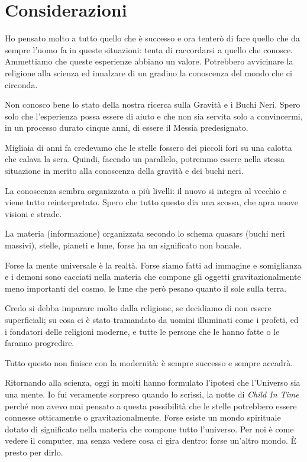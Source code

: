 \chapter{Considerazioni}
\label{considerazioni} %

Ho pensato molto a tutto quello che è successo e ora tenterò di fare quello che da sempre l'uomo fa in queste situazioni: tenta di raccordarsi a quello che conosce. Ammettiamo che queste esperienze abbiano un valore. Potrebbero avvicinare la religione alla scienza ed innalzare di un gradino la conoscenza del mondo che ci circonda.

Non conosco bene lo stato della nostra ricerca sulla Gravità e i Buchi Neri. Spero solo che l'esperienza possa essere di aiuto e che non sia servita solo a convincermi, in un processo durato cinque anni, di essere il Messia predesignato.

Migliaia di anni fa credevamo che le stelle fossero dei piccoli fori su una calotta che calava la sera. Quindi, facendo un parallelo, potremmo essere nella stessa situazione in merito alla conoscenza della gravità e dei buchi neri.

La conoscenza sembra organizzata a più livelli: il nuovo si integra al vecchio e viene tutto reinterpretato. Spero che tutto questo dia una scossa, che apra nuove visioni e strade.

La materia (informazione) organizzata secondo lo schema quasars (buchi neri massivi), stelle, pianeti e lune, forse ha un significato non banale.

Forse la mente universale è la realtà. Forse siamo fatti ad immagine e somiglianza e i demoni sono cacciati nella materia che compone gli oggetti gravitazionalmente meno importanti del cosmo, le lune che però pesano quanto il sole sulla terra.

Credo si debba imparare molto dalla religione, se decidiamo di non essere superficiali; su cosa ci è stato tramandato da uomini illuminati come i profeti, ed i fondatori delle religioni moderne, e tutte le persone che le hanno fatte o le faranno progredire.

Tutto questo non finisce con la modernità: è sempre successo e sempre accadrà.

Ritornando alla scienza, oggi in molti hanno formulato l'ipotesi che l'Universo sia una mente. Io fui veramente sorpreso quando lo scrissi, la notte di \textit{Child In Time} perché non avevo mai pensato a questa possibilità che le stelle potrebbero essere connesse otticamente o gravitazionalmente. Forse esiste un mondo spirituale dotato di significato nella materia che compone tutto l'universo. Per noi è come vedere il computer, ma senza vedere cosa ci gira dentro: forse un'altro mondo. È presto per dirlo.

